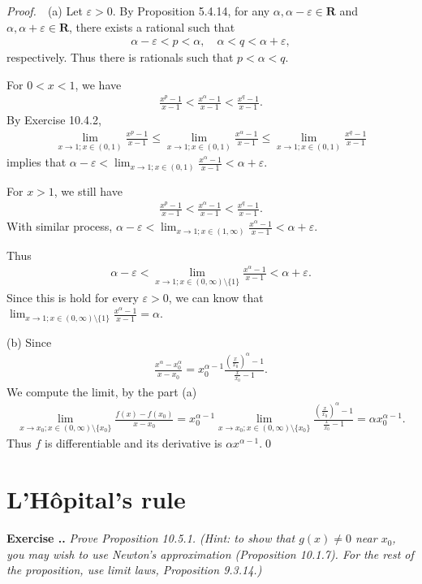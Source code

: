 \documentclass{book}
\newcommand{\pff}{\vspace{.25em}\noindent\emph{Proof.}~~}
\newcounter{Exercise}[section]
\renewcommand{\theExercise}{\thesection.\arabic{Exercise}.}
\newcommand{\new}{\vspace{1.5em}\noindent\textbf{{Exercise \stepcounter{Exercise}\textbf{\theExercise}}} }
\begin{document}
\pff (a) Let $\varepsilon>0$. By Proposition 5.4.14, for any $\alpha,\alpha-\varepsilon\in\mathbf{R}$ and $\alpha,\alpha+\varepsilon\in\mathbf{R}$, there exists a rational such that
    \begin{align*}
        \alpha-\varepsilon<p<\alpha,\quad \alpha<q<\alpha+\varepsilon,
    \end{align*}
respectively. Thus there is rationals such that $p<\alpha<q$.

For $0<x<1$, we have
    \begin{align*}
        \frac{x^p-1}{x-1}<\frac{x^\alpha-1}{x-1}<\frac{x^q-1}{x-1}.
    \end{align*}
By Exercise 10.4.2,
    \begin{align*}
        \lim_{x\to 1;x\in(0,1)}\frac{x^p-1}{x-1}\leq\lim_{x\to 1;x\in(0,1)}\frac{x^\alpha-1}{x-1}\leq\lim_{x\to 1;x\in(0,1)}\frac{x^q-1}{x-1}
    \end{align*}
implies that $\alpha-\varepsilon<\lim_{x\to 1;x\in(0,1)}\frac{x^\alpha-1}{x-1}<\alpha+\varepsilon$.

For $x>1$, we still have
    \begin{align*}
        \frac{x^p-1}{x-1}<\frac{x^\alpha-1}{x-1}<\frac{x^q-1}{x-1}.
    \end{align*}
With similar process, $\alpha-\varepsilon<\lim_{x\to 1;x\in(1,\infty)}\frac{x^\alpha-1}{x-1}<\alpha+\varepsilon$.

Thus
    \begin{align*}
        \alpha-\varepsilon<\lim_{x\to 1;x\in(0,\infty)\setminus\{1\}}\frac{x^\alpha-1}{x-1}<\alpha+\varepsilon.
    \end{align*}
Since this is hold for every $\varepsilon>0$, we can know that $\lim_{x\to 1;x\in(0,\infty)\setminus\{1\}}\frac{x^\alpha-1}{x-1}=\alpha$.

(b) Since
    \begin{align*}
        \frac{x^\alpha-x_0^\alpha}{x-x_0}=x_0^{\alpha-1}\frac{(\frac{x}{x_0})^\alpha-1}{\frac{x}{x_0}-1}.
    \end{align*}
We compute the limit, by the part (a)
    \begin{align*}
        \lim_{x\to x_0;x\in(0,\infty)\setminus\{x_0\}}\frac{f(x)-f(x_0)}{x-x_0}
        =x_0^{\alpha-1}\lim_{x\to x_0;x\in(0,\infty)\setminus\{x_0\}}\frac{(\frac{x}{x_0})^\alpha-1}{\frac{x}{x_0}-1}=\alpha x_0^{\alpha-1}.
    \end{align*}
Thus $f$ is differentiable and its derivative is $\alpha x^{\alpha-1}$.\qed

\section{L'H\^opital's rule}
\new\emph{Prove Proposition 10.5.1. (Hint: to show that $g(x)\neq 0$ near $x_0$, you may wish to use Newton's approximation (Proposition 10.1.7). For the rest of the proposition, use limit laws, Proposition 9.3.14.)}
\end{document}
